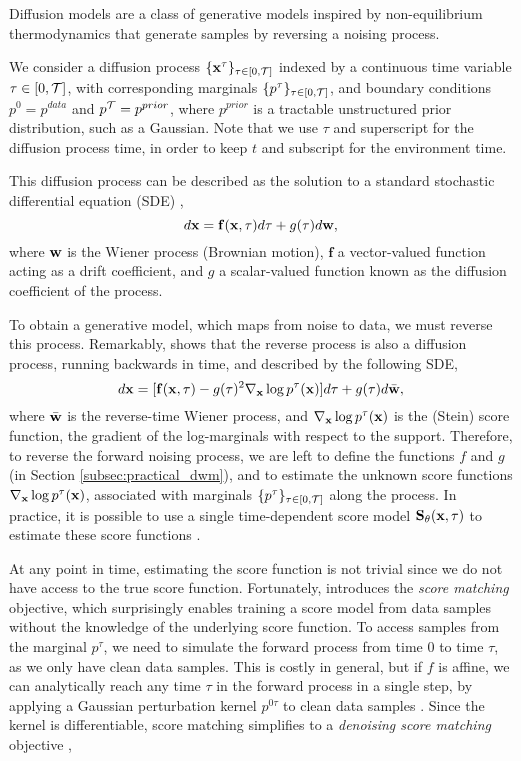 Diffusion models \citep{sohl2015difforigin} are a class of generative models inspired by non-equilibrium thermodynamics that generate samples by reversing a noising process.

We consider a diffusion process $\{\mathbf{x}^\tau\}_{\tau \in [0,\mathcal{T}]}$ indexed by a continuous time variable $\tau \in [0,\mathcal{T}]$, with corresponding marginals $\{p^\tau\}_{\tau \in [0,\mathcal{T}]}$, and boundary conditions $p^0 = p^{data}$ and $p^{\mathcal{T}} = p^{prior}$, where $p^{prior}$ is a tractable unstructured prior distribution, such as a Gaussian. Note that we use $\tau$ and superscript for the diffusion process time, in order to keep $t$ and subscript for the environment time.

This diffusion process can be described as the solution to a standard stochastic differential equation (SDE) \citep{song_sde},
\begin{equation}
\label{eq:forward_process}
    d\mathbf{x} = \mathbf{f} (\mathbf{x}, \tau) d\tau +  g(\tau) d\mathbf{w}, 
\end{equation}
where $\mathbf{w}$ is the Wiener process (Brownian motion), $\mathbf{f}$ a vector-valued function acting as a drift coefficient, and  $g$ a scalar-valued function known as the diffusion coefficient of the process.

To obtain a generative model, which maps from noise to data, we must reverse this process. Remarkably, \citet{anderson1982reverse} shows that the reverse process is also a diffusion process, running backwards in time, and described by the following SDE,
\begin{equation}
\label{eq:reverse_process}
    d\mathbf{x} = [\mathbf{f} (\mathbf{x}, \tau) - g(\tau)^2 \nabla_{\mathbf{x}} \log p^\tau(\mathbf{x})] d\tau +  g(\tau) d\Bar{\mathbf{w}}, 
\end{equation}
where $\Bar{\mathbf{w}}$ is the reverse-time Wiener process, and $\nabla_{\mathbf{x}} \log p^\tau(\mathbf{x})$ is the (Stein) score function, the gradient of the log-marginals with respect to the support. Therefore, to reverse the forward noising process, we are left to define the functions $f$ and $g$ (in Section \ref{subsec:practical_dwm}), and to estimate the unknown score functions $\nabla_{\mathbf{x}} \log p^\tau(\mathbf{x})$, associated with marginals $\{p^\tau\}_{\tau \in [0,\mathcal{T}]}$ along the process. In practice, it is possible to use a single time-dependent score model $\mathbf{S}_\theta(\mathbf{x}, \tau)$ to estimate these score functions \citep{song_sde}.

At any point in time, estimating the score function is not trivial since we do not have access to the true score function. Fortunately, \citet{hyvarinen2005estimation} introduces the \textit{score matching} objective, which surprisingly enables training a score model from data samples without the knowledge of the underlying score function. To access samples from the marginal $p^\tau$, we need to simulate the forward process from time $0$ to time $\tau$, as we only have clean data samples. This is costly in general, but if $f$ is affine, we can analytically reach any time $\tau$ in the forward process in a single step, by applying a Gaussian perturbation kernel $p^{0\tau}$ to clean data samples \citep{song_sde}. Since the kernel is differentiable, score matching simplifies to a \textit{denoising score matching} objective \citep{vincent2011connection},

